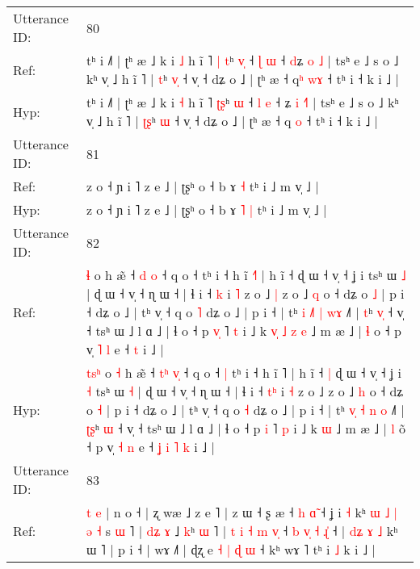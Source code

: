 \documentclass[10pt]{article}
\DeclareRobustCommand{\hl}[1]{{\textcolor{red}{#1}}}
\begin{document}
\begin{longtable}{ll}
 \\
\midrule
Utterance ID: & 80 \\
Ref: & tʰ i ˩˥ | ʈʰ æ ˩ k i \hl{˩} h ĩ ˥ \hl{|}\hl{ }\hl{t}ʰ \hl{v}\hl{̩} ˧ \hl{ɭ} \hl{ɯ} ˧ \hl{d}ʑ \hl{o} \hl{}\hl{˩} | tsʰ e ˩ s o ˩ kʰ v̩ ˩ h ĩ ˥ | \hl{}\hl{t}ʰ \hl{v}\hl{̩} ˧ v̩ ˧ dʑ o ˩ | ʈʰ æ ˧ q\hl{ʰ} \hl{w}\hl{ɤ} ˧ tʰ i ˧ k i ˩ |
 \\
Hyp: & tʰ i ˩˥ | ʈʰ æ ˩ k i \hl{˧} h ĩ ˥ \hl{}\hl{ʈ}\hl{ʂ}ʰ \hl{}\hl{ɯ} ˧ \hl{l} \hl{e} ˧ \hl{}ʑ \hl{i} \hl{˧}\hl{˥} | tsʰ e ˩ s o ˩ kʰ v̩ ˩ h ĩ ˥ | \hl{ʈ}\hl{ʂ}ʰ \hl{}\hl{ɯ} ˧ v̩ ˧ dʑ o ˩ | ʈʰ æ ˧ q\hl{} \hl{}\hl{o} ˧ tʰ i ˧ k i ˩ |
 \\
\midrule
Utterance ID: & 81 \\
Ref: & z o ˧ ɲ i ˥ z e ˩ | ʈʂʰ o ˧ b ɤ\hl{}\hl{} \hl{˧} tʰ i ˩ m v̩ ˩ |
 \\
Hyp: & z o ˧ ɲ i ˥ z e ˩ | ʈʂʰ o ˧ b ɤ\hl{ }\hl{˥} \hl{|} tʰ i ˩ m v̩ ˩ |
 \\
\midrule
Utterance ID: & 82 \\
Ref: & \hl{}\hl{}\hl{ɬ} o\hl{}\hl{} h æ̃ ˧ \hl{}\hl{d} \hl{}\hl{o} ˧ q o ˧\hl{}\hl{} tʰ i ˧ h ĩ \hl{˧}˥ | h ĩ ˧\hl{}\hl{} ɖ ɯ ˧ v̩ ˧ ʝ i\hl{}\hl{} tsʰ ɯ \hl{˩} | ɖ ɯ ˧ v̩ ˧ ɳ ɯ ˧ | ɬ i ˧ \hl{}\hl{k} i \hl{˥} z o ˩\hl{ }\hl{|} z o ˩ \hl{q} o ˧ dʑ o \hl{˩} | p i ˧ dʑ o ˩ | tʰ v̩ ˧ q o \hl{˥} dʑ o ˩ | p i ˧ | tʰ \hl{i}\hl{ }\hl{˩}\hl{˥} \hl{|} \hl{w}\hl{ɤ} ˩˥ | \hl{}\hl{t}ʰ \hl{v}\hl{̩} ˧ v̩ ˧ tsʰ ɯ ˩ l ɑ ˩ | ɬ o ˧ p \hl{v}\hl{̩} ˥ \hl{t} i ˩ k\hl{ }\hl{v}\hl{̩}\hl{ }\hl{˩}\hl{ }\hl{z} \hl{e} ˩ m æ ˩ | \hl{ɬ} o\hl{} ˧ p v̩ \hl{˥} \hl{l} e ˧\hl{}\hl{}\hl{}\hl{}\hl{}\hl{} \hl{t} i ˩ |
 \\
Hyp: & \hl{t}\hl{s}\hl{ʰ} o\hl{ }\hl{˧} h æ̃ ˧ \hl{t}\hl{ʰ} \hl{v}\hl{̩} ˧ q o ˧\hl{ }\hl{|} tʰ i ˧ h ĩ \hl{}˥ | h ĩ ˧\hl{ }\hl{|} ɖ ɯ ˧ v̩ ˧ ʝ i\hl{ }\hl{˧} tsʰ ɯ \hl{˧} | ɖ ɯ ˧ v̩ ˧ ɳ ɯ ˧ | ɬ i ˧ \hl{t}\hl{ʰ} i \hl{˧} z o ˩\hl{}\hl{} z o ˩ \hl{h} o ˧ dʑ o \hl{˧} | p i ˧ dʑ o ˩ | tʰ v̩ ˧ q o \hl{˧} dʑ o ˩ | p i ˧ | tʰ \hl{v}\hl{̩}\hl{ }\hl{˧} \hl{n} \hl{}\hl{o} ˩˥ | \hl{ʈ}\hl{ʂ}ʰ \hl{}\hl{ɯ} ˧ v̩ ˧ tsʰ ɯ ˩ l ɑ ˩ | ɬ o ˧ p \hl{}\hl{i} ˥ \hl{p} i ˩ k\hl{}\hl{}\hl{}\hl{}\hl{}\hl{}\hl{} \hl{ɯ} ˩ m æ ˩ | \hl{l} o\hl{̃} ˧ p v̩ \hl{˧} \hl{n} e ˧\hl{ }\hl{ʝ}\hl{ }\hl{i}\hl{ }\hl{˥} \hl{k} i ˩ |
 \\
\midrule
Utterance ID: & 83 \\
Ref: & \hl{t} \hl{e} | n o ˧ | ʐ wæ ˩ z e ˥ | z ɯ ˧ ʂ æ ˧ \hl{h} \hl{}\hl{ɑ}\hl{̃} ˧ ʝ i \hl{˧} kʰ\hl{ }\hl{ɯ}\hl{ }\hl{˩} \hl{|}\hl{ }\hl{ə} \hl{˧} s \hl{ɯ} ˥ | \hl{d}\hl{ʑ} \hl{ɤ} ˩ \hl{k}ʰ \hl{ɯ} ˥ |\hl{ }\hl{t}\hl{ }\hl{i}\hl{ }\hl{˧} \hl{m} \hl{v}\hl{̩} ˧\hl{ }\hl{b}\hl{ }\hl{v}\hl{̩} \hl{˧} \hl{ɻ}\hl{̍} ˧ | \hl{d}\hl{ʑ} \hl{ɤ} \hl{˩} kʰ ɯ ˥ | p i ˧ | wɤ ˩˥ | ɖʐ e\hl{ }\hl{˧}\hl{ }\hl{|}\hl{ }\hl{ɖ}\hl{ }\hl{ɯ} ˧ kʰ wɤ ˥ tʰ i \hl{˩} k i ˩ |

\end{longtable}
\end{document}
